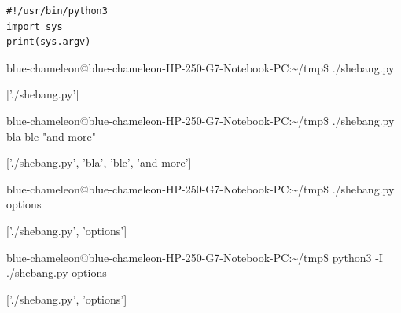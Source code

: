 \begin{frame}[fragile]
%
\begin{codebox}
\begin{verbatim}
#!/usr/bin/python3
import sys
print(sys.argv)
\end{verbatim}
\end{codebox}
%
\begin{cmdbox}
\scriptsize
{\color{green}blue-chameleon@blue-chameleon-HP-250-G7-Notebook-PC}:{\color{blue}\textasciitilde/tmp}\$
./shebang.py

['./shebang.py']

{\color{green}blue-chameleon@blue-chameleon-HP-250-G7-Notebook-PC}:{\color{blue}\textasciitilde/tmp}\$
./shebang.py bla ble "and more"

['./shebang.py', 'bla', 'ble', 'and more']

{\color{green}blue-chameleon@blue-chameleon-HP-250-G7-Notebook-PC}:{\color{blue}\textasciitilde/tmp}\$
./shebang.py options

['./shebang.py', 'options']

{\color{green}blue-chameleon@blue-chameleon-HP-250-G7-Notebook-PC}:{\color{blue}\textasciitilde/tmp}\$
python3 -I ./shebang.py options

['./shebang.py', 'options']
\end{cmdbox}
%
\end{frame}


